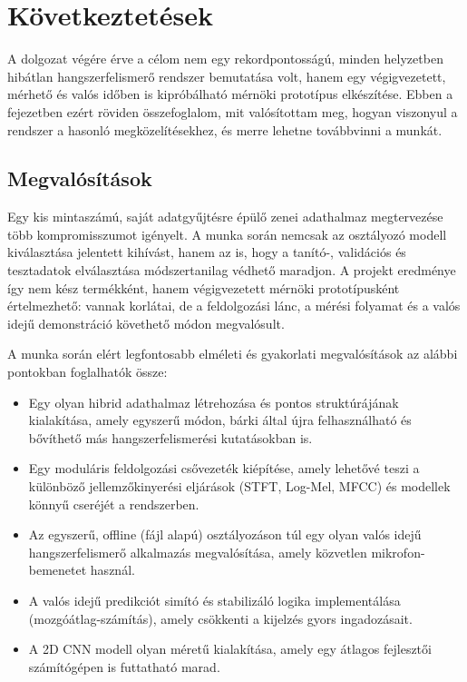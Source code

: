 \chapter{Következtetések}

A dolgozat végére érve a célom nem egy rekordpontosságú, minden helyzetben
hibátlan hangszerfelismerő rendszer bemutatása volt, hanem egy végigvezetett,
mérhető és valós időben is kipróbálható mérnöki prototípus elkészítése. Ebben
a fejezetben ezért röviden összefoglalom, mit valósítottam meg, hogyan
viszonyul a rendszer a hasonló megközelítésekhez, és merre lehetne továbbvinni
a munkát.

\section{Megvalósítások}
Egy kis mintaszámú, saját adatgyűjtésre épülő zenei adathalmaz megtervezése több kompromisszumot igényelt. A munka során nemcsak az osztályozó modell kiválasztása jelentett kihívást, hanem az is, hogy a tanító-, validációs és tesztadatok elválasztása módszertanilag védhető maradjon. A projekt eredménye így nem kész termékként, hanem végigvezetett mérnöki prototípusként értelmezhető: vannak korlátai, de a feldolgozási lánc, a mérési folyamat és a valós idejű demonstráció követhető módon megvalósult.

A munka során elért legfontosabb elméleti és gyakorlati megvalósítások az alábbi pontokban foglalhatók össze:
\begin{itemize}
    \item Egy olyan hibrid adathalmaz létrehozása és pontos struktúrájának kialakítása, amely egyszerű módon, bárki által újra felhasználható és bővíthető más hangszerfelismerési kutatásokban is.
    \item Egy moduláris feldolgozási csővezeték kiépítése, amely lehetővé teszi a különböző jellemzőkinyerési eljárások (STFT, Log-Mel, MFCC) és modellek könnyű cseréjét a rendszerben.
    \item Az egyszerű, offline (fájl alapú) osztályozáson túl egy olyan valós idejű hangszerfelismerő alkalmazás megvalósítása, amely közvetlen mikrofon-bemenetet használ.
    \item A valós idejű predikciót simító és stabilizáló logika implementálása (mozgóátlag-számítás), amely csökkenti a kijelzés gyors ingadozásait.
    \item A 2D CNN modell olyan méretű kialakítása, amely egy átlagos fejlesztői számítógépen is futtatható marad.
\end{itemize}

